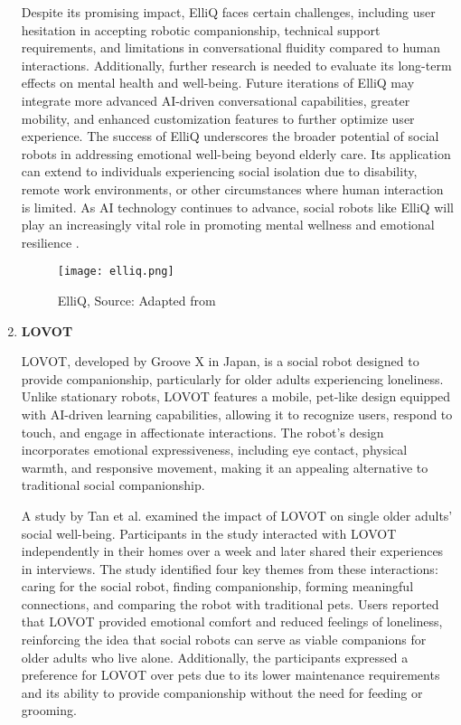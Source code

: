 \begin{enumerate}
Despite its promising impact, ElliQ faces certain challenges, including user hesitation in accepting robotic companionship, technical support requirements, and limitations in conversational fluidity compared to human interactions. Additionally, further research is needed to evaluate its long-term effects on mental health and well-being. Future iterations of ElliQ may integrate more advanced AI-driven conversational capabilities, greater mobility, and enhanced customization features to further optimize user experience. The success of ElliQ underscores the broader potential of social robots in addressing emotional well-being beyond elderly care. Its application can extend to individuals experiencing social isolation due to disability, remote work environments, or other circumstances where human interaction is limited. As AI technology continues to advance, social robots like ElliQ will play an increasingly vital role in promoting mental wellness and emotional resilience \cite{Broadbent2024}.


\begin{figure}[ht]
    \centering
    \texttt{[image: elliq.png]}
    \caption{ElliQ, Source: Adapted from \cite{ieee2023elliq}}
    \label{fig:elliq}
\end{figure}

\newpage
    \item{\bf{LOVOT}}
    \vspace{0.25cm}


LOVOT, developed by Groove X in Japan, is a social robot designed to provide companionship, particularly for older adults experiencing loneliness. Unlike stationary robots, LOVOT features a mobile, pet-like design equipped with AI-driven learning capabilities, allowing it to recognize users, respond to touch, and engage in affectionate interactions. The robot's design incorporates emotional expressiveness, including eye contact, physical warmth, and responsive movement, making it an appealing alternative to traditional social companionship.

A study by Tan et al. \cite{tan2024lovot} examined the impact of LOVOT on single older adults’ social well-being. Participants in the study interacted with LOVOT independently in their homes over a week and later shared their experiences in interviews. The study identified four key themes from these interactions: caring for the social robot, finding companionship, forming meaningful connections, and comparing the robot with traditional pets. Users reported that LOVOT provided emotional comfort and reduced feelings of loneliness, reinforcing the idea that social robots can serve as viable companions for older adults who live alone. Additionally, the participants expressed a preference for LOVOT over pets due to its lower maintenance requirements and its ability to provide companionship without the need for feeding or grooming.


\end{enumerate}
